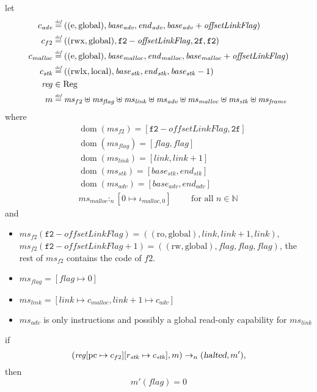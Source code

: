\documentclass[a4paper]{article}
\newcommand{\update}[2]{[#1 \mapsto #2]}
\newcommand{\defeq}{\stackrel{\textit{\tiny{def}}}{=}}
\DeclareMathOperator{\dom}{dom}
\newcommand{\var}[1]{\mathit{#1}}
\newcommand{\hs}{\var{ms}}
\newcommand{\ms}{\hs}
\newcommand{\pcreg}{\mathrm{pc}}
\newcommand{\start}{\var{base}}
\newcommand{\addrend}{\var{end}}
\newcommand{\reg}{\var{reg}}
\newcommand{\heap}{\var{mem}}
\newcommand{\adv}{\var{adv}}
\newcommand{\link}{\var{link}}
\newcommand{\stk}{\var{stk}}
\newcommand{\flag}{\var{flag}}
\newcommand{\olf}{\var{offsetLinkFlag}}
\newcommand{\halted}{\textsl{halted}}
\newcommand{\heapSat}[3][\heap]{#1 :_{#2} #3}
\newcommand{\codelabel}[1]{\mathit{#1}}
\newcommand{\malloc}{\codelabel{malloc}}
\newcommand{\plaindom}[1]{\mathrm{#1}}
\newcommand{\Regs}{\plaindom{Reg}}
\newcommand{\nats}{\mathbb{N}}
\newcommand{\plainperm}[1]{\mathrm{#1}}
\newcommand{\readonly}{\plainperm{ro}}
\newcommand{\readwrite}{\plainperm{rw}}
\newcommand{\entry}{\plainperm{e}}
\newcommand{\rwx}{\plainperm{rwx}}
\newcommand{\rwlx}{\plainperm{rwlx}}
\newcommand{\local}{\plainperm{local}}
\newcommand{\glob}{\plainperm{global}}
\newcommand{\step}[1][]{\rightarrow_{#1}}
\begin{document}
              \begin{lemma}
                \label{lem:correctness-f2}
                let
                \begin{align*}
                  c_{\var{adv}} & \defeq ((\entry,\glob),\start_{\adv},\addrend_{\adv},\start_{\adv}+\olf) \\
                  c_{f2} & \defeq ((\rwx,\glob),\mathtt{f2}-\olf,\mathtt{2f},\mathtt{f2}) \\
                  c_\malloc & \defeq ((\entry,\glob),\start_\malloc,\addrend_\malloc,\start_\malloc+\olf) \\
                  c_{\var{stk}} & \defeq ((\rwlx,\local),\start_\stk,\addrend_\stk,\start_\stk-1) \\
                  \reg & \in \Regs \\
                  m & \defeq \hs_{f2} \uplus 
                      \hs_\flag \uplus                
                      \ms_{\var{link}} \uplus 
                      \hs_\adv \uplus 
                      \ms_{\malloc} \uplus 
                      \ms_{\var{stk}} \uplus
                      \ms_{\var{frame}} 
                \end{align*}
                where 
                \begin{align*}
                  &\dom(\hs_{f2}) = [\mathtt{f2}-\olf,\mathtt{2f}] \\
                  &\dom(\hs_\flag) = [\flag,\flag] \\
                  &\dom(\ms_\link) = [\link,\link+1]\\
                  &\dom(\ms_\stk) = [\start_\stk, \addrend_\stk]\\
                  &\dom(\hs_{\adv}) = [\start_\adv,\addrend_\adv] \\
                  &\heapSat[\hs_{\malloc}]{n}{[0 \mapsto \iota_{\malloc,0}]} \qquad \text{ for all $n \in \nats$}
                \end{align*}
                and
                \begin{itemize}
                \item $\ms_{f2}(\mathtt{f2}-\olf) = ((\readonly,\glob),\link,\link+1,\link)$, $\ms_{f2}(\mathtt{f2}-\olf+1) = ((\readwrite,\glob),\flag,\flag,\flag)$, the rest of $\hs_{f2}$ contains the code of $f2$.
                \item $\ms_\flag = [\flag \mapsto 0]$
                \item $\ms_{\var{link}} = [\var{link} \mapsto c_\malloc, \var{link} + 1 \mapsto c_\adv]$
                \item $\hs_\adv$ is only instructions and possibly a global read-only capability for $\hs_\link$
                \end{itemize}
                if 
                \[
                  (\reg\update{\pcreg}{c_{f2}}\update{r_\stk}{c_\stk},m) \step[n] (\halted,m'),
                \]
                then
                \[
                  m'(\flag) = 0
                \]  
              \end{lemma}
\end{document}
